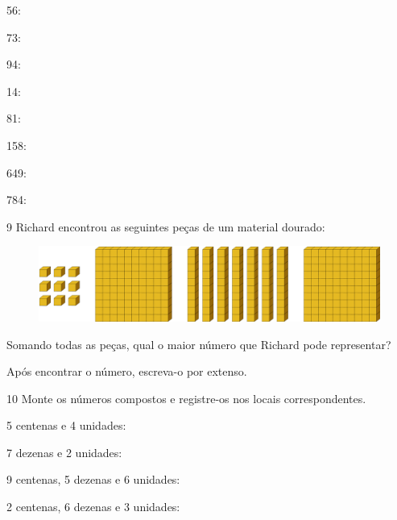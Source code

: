 \begin{escolha}
\item 56: 

\item 73: 

\item 94: 

\item 14: 

\item 81: 

\item 158: 

\item 649: 

\item 784: 
\end{escolha}


\num{9} Richard encontrou as seguintes peças de um material dourado:

\begin{figure}[htpb!]
\includegraphics[width=\textwidth]{./media/image4.png}
\end{figure}

\item Somando todas as peças, qual o maior número que Richard pode representar? 

\item Após encontrar o número, escreva-o por extenso.

\num{10} Monte os números compostos e registre-os nos locais correspondentes.

\begin{escolha}
\item 5 centenas e 4 unidades:
\reduline{504\hfill}

\item 7 dezenas e 2 unidades:
\reduline{72\hfill}

\item 9 centenas, 5 dezenas e 6 unidades:
\reduline{956\hfill}

\item 2 centenas, 6 dezenas e 3 unidades:
\reduline{263\hfill}

\end{escolha}

